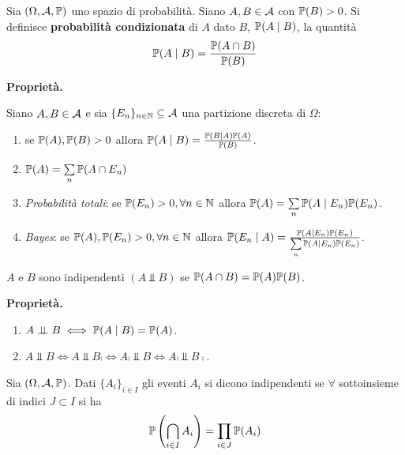 
\ParteEsercizi

\begin{definition}
	Sia $(\Omega,\mathcal{A},\mathbb{P})$ uno spazio di probabilità. Siano $A,B\in \mathcal{A}$ con $\mathbb{P}(B)  >0$. Si definisce \textbf{probabilità condizionata} di $A$ dato $B$, $\mathbb{P}(A\mid B)$, la quantità
	\begin{equation*}
		\mathbb{P}(A\mid B) =\frac{\mathbb{P}(A\cap B)}{\mathbb{P}(B)}
	\end{equation*}
\end{definition}
\textbf{Proprietà.}

Siano $A,B\in \mathcal{A}$ e sia $\{E_{n}\}_{n\in \mathbb{N}} \subseteq \mathcal{A}$ una partizione discreta di $\Omega $:
\begin{enumerate}
	\item se $\mathbb{P}(A) ,\mathbb{P}(B)  >0$ allora $\mathbb{P}(A\mid B) =\frac{\mathbb{P}(B\mid A)\mathbb{P}(A)}{\mathbb{P}(B)}$.
	\item $\mathbb{P}(A) =\sum\limits_{n}\mathbb{P}(A\cap E_{n})$
	\item \textit{Probabilità totali}: se $\mathbb{P}(E_{n})  >0,\forall n\in \mathbb{N}$ allora $\mathbb{P}(A) =\sum\limits_{n}\mathbb{P}(A\mid E_{n})\mathbb{P}(E_{n})$.
	\item \textit{Bayes}: se $\mathbb{P}(A) ,\mathbb{P}(E_{n})  >0,\forall n\in \mathbb{N}$ allora $\mathbb{P}(E_{n} \mid A) =\frac{\mathbb{P}(A\mid E_{n})\mathbb{P}(E_{n})}{\sum\limits_{n}\mathbb{P}(A\mid E_{n})\mathbb{P}(E_{n})}$.
\end{enumerate}
\begin{definition}
	$A$ e $B$ sono indipendenti $(A\Bot B)$ se $\mathbb{P}(A\cap B) =\mathbb{P}(A)\mathbb{P}(B)$.
\end{definition}
\textbf{Proprietà.}
\begin{enumerate}
	\item $A\perp \!\!\! \perp B\iff \mathbb{P}(A\mid B) =\mathbb{P}(A)$.
	\item $A\Bot B\iff A\Bot B\comp \iff A\comp \Bot B\iff A\comp \Bot B\comp$.
\end{enumerate}
\begin{definition}
	Sia $(\Omega,\mathcal{A},\mathbb{P})$. Dati $\{A_{i}\}_{i\in I}$ gli eventi $A_{i}$ si dicono indipendenti se $\forall $ sottoinsieme di indici $J\subset I$ si ha
	\begin{equation*}
		\mathbb{P}\left(\bigcap_{i\in I} A_{i}\right) =\prod_{i\in J}\mathbb{P}(A_{i})
	\end{equation*}
\end{definition}

\Esercizio{}

